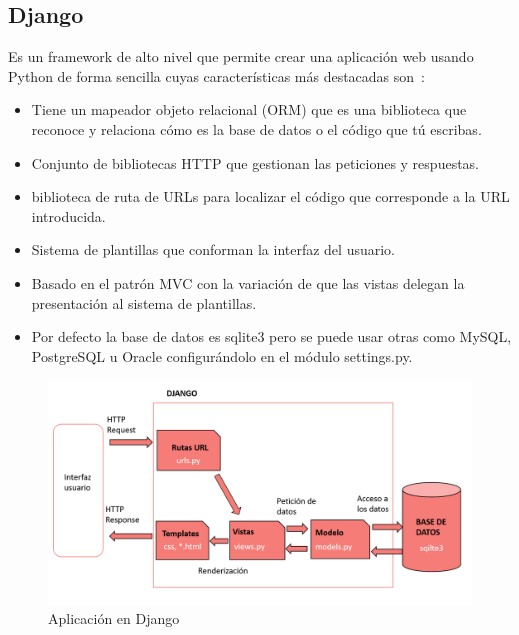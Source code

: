 \documentclass[a4paper, 12pt]{book}
\begin{document}
\subsection{Django}
Es un framework de alto nivel que permite crear una aplicación web usando Python de forma sencilla cuyas características más destacadas son~\cite{bennett2009practical}:
\begin{itemize}
    \item Tiene un mapeador objeto relacional (ORM) que es una biblioteca que reconoce y relaciona cómo es la base de datos o el código que tú escribas.
    \item Conjunto de bibliotecas HTTP que gestionan las peticiones y respuestas.
    \item biblioteca de ruta de URLs para localizar el código que corresponde a la URL introducida. 
    \item Sistema de plantillas que conforman la interfaz del usuario.
    \item Basado en el patrón MVC con la variación de que las vistas delegan la presentación al sistema de plantillas.
    \item Por defecto la base de datos es sqlite3 pero se puede usar otras como MySQL, PostgreSQL u Oracle configurándolo en el módulo settings.py.
   
\end{itemize}

\begin{figure}[h]
        \centering
        \includegraphics[scale=0.43]{img/django.png}
        \caption{Aplicación en Django }
        \label{figura:appDjango}
\end{figure}
\end{document}
